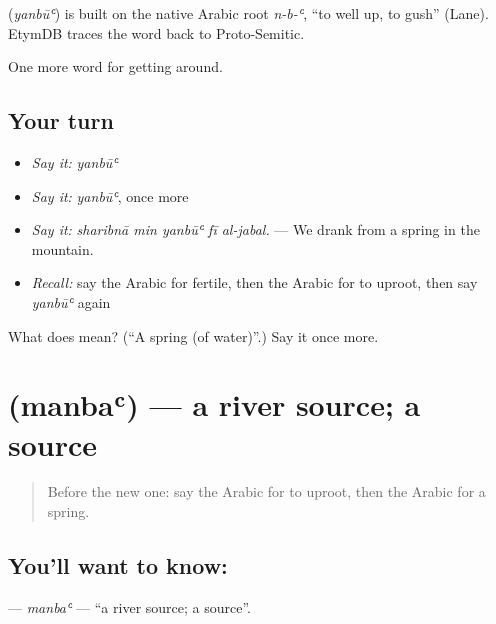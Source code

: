 \begin{cousinweb}
\textbf{} (\emph{yanbūʿ}) is built on the native Arabic root \emph{n-b-ʿ}, \textquotedblleft{}to well up, to gush\textquotedblright{} (Lane). EtymDB traces the word back to Proto-Semitic.
\end{cousinweb}

\begin{grammarlens}[title={What you've built}]
One more word for getting around.
\end{grammarlens}

\subsection*{Your turn}
\begin{itemize}
\raggedright
  \item \emph{Say it:} \emph{yanbūʿ}
  \item \emph{Say it:} \emph{yanbūʿ}, once more
  \item \emph{Say it:} \emph{sharibnā min yanbūʿ fī al-jabal.} — We drank from a spring in the mountain.
  \item \emph{Recall:} say the Arabic for fertile, then the Arabic for to uproot, then say \emph{yanbūʿ} again
\end{itemize}

\begin{tcolorbox}[breakable,colback=teal!4,colframe=teal!35!black,title={Before you move on}]
What does  mean? (\textquotedblleft{}A spring (of water)\textquotedblright{}.) Say it once more.
\end{tcolorbox}
\section[\texorpdfstring{\ar{منبع} (manbaʿ)}{منبع (manbaʿ)}]{ (manbaʿ) — a river source; a source}

\label{lesson:AR-C470-manba}



\begin{quote}
Before the new one: say the Arabic for to uproot, then the Arabic for a spring.
\end{quote}

\subsection*{You'll want to know: }
\textbf{} — \emph{manbaʿ} — \textquotedblleft{}a river source; a source\textquotedblright{}.

